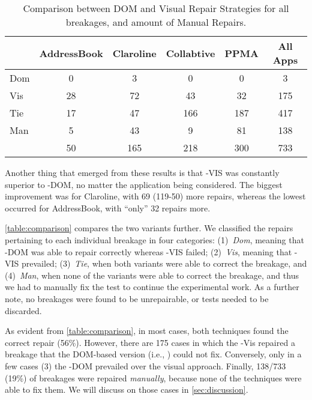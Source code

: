 \begin{table}[b]
\setlength{\tabcolsep}{1pt}
\renewcommand{\arraystretch}{0.9}
\centering
\caption{Comparison between DOM and Visual Repair Strategies for all breakages, and amount of Manual Repairs.}
\label{table:comparison}
\begin{tabular}{lSSSSS}
\toprule
& {\sc \small AddressBook} & {\sc \small Claroline} & {\sc \small Collabtive} & {\sc \small PPMA} & {\sc \small All Apps} \\
\midrule
Dom 	& 0           & 3         & 0          & 0    & 3        \\
Vis 	& 28          & 72        & 43         & 32   & 175      \\
Tie 	& 17          & 47        & 166        & 187  & 417      \\
Man 	& 5           & 43        & 9          & 81   & 138      \\
\midrule
		& 50     & 165  & 218   & 300 & 733   \\
\bottomrule  
\end{tabular}
\end{table}

Another thing that emerged from these results is that \tool-VIS was constantly superior to \tool-DOM, no matter the application being considered. The biggest improvement was for Claroline, with 69 (119-50) more repairs, whereas the lowest occurred for AddressBook, with ``only'' 32 repairs more. 

\autoref{table:comparison} compares the two variants further. We classified the repairs pertaining to each individual breakage in four categories: (1)~\textit{Dom}, meaning that \tool-DOM was able to repair correctly whereas \tool-VIS failed; (2)~\textit{Vis}, meaning that \tool-VIS prevailed; (3)~\textit{Tie}, when both variants were able to correct the breakage, and (4)~\textit{Man}, when none of the variants were able to correct the breakage, and thus we had to manually fix the test to continue the experimental work. As a further note, no breakages were found to be unrepairable, or tests needed to be discarded. 

As evident from \autoref{table:comparison}, in most cases, both techniques found the correct repair (56\%). However, there are 175 cases in which the \tool-Vis repaired a breakage that the DOM-based version (i.e., \water) could not fix. Conversely, only in a few cases (3) the \tool-DOM prevailed over the visual approach. Finally, 138/733 (19\%) of breakages were repaired \textit{manually}, because none of the techniques were able to fix them.
We will discuss on those cases in \autoref{sec:discussion}.


